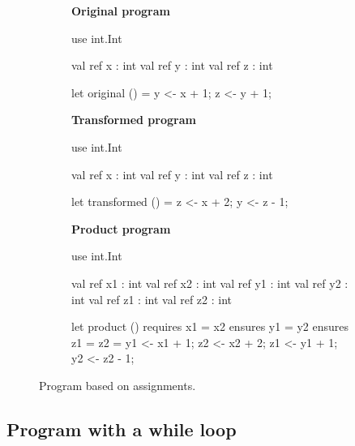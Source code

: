 \begin{figure}
  \centering
  \begin{subfigure}[b]{0.45\textwidth}
    \begin{minipage}[t]{\linewidth}
      \textbf{Original program}
      \begin{whylang}
        use int.Int
      
        val ref x : int
        val ref y : int
        val ref z : int
      
        let original ()
          =
          y <- x + 1; 
          z <- y + 1;
      \end{whylang}
    \end{minipage}
  \end{subfigure}
  \hfill
  \begin{subfigure}[b]{0.45\textwidth}
    \begin{minipage}[t]{\linewidth}
      \textbf{Transformed program}
      \begin{whylang}
        use int.Int
      
        val ref x : int
        val ref y : int
        val ref z : int
      
        let transformed ()
          =
          z <- x + 2; 
          y <- z - 1;
      \end{whylang}
    \end{minipage}
  \end{subfigure}
  \hfill
  \begin{subfigure}[b]{0.9\textwidth}
    \begin{minipage}[t]{\linewidth}
      \textbf{Product program}
      \begin{whylang}
        use int.Int
      
        val ref x1 : int
        val ref x2 : int
        val ref y1 : int
        val ref y2 : int
        val ref z1 : int
        val ref z2 : int
      
        let product ()
          requires { x1 = x2 }
          ensures { y1 = y2 }
          ensures { z1 = z2 }
          =
          y1 <- x1 + 1; 
          z2 <- x2 + 2;
          z1 <- y1 + 1;
          y2 <- z2 - 1;
      \end{whylang}
    \end{minipage}
  \end{subfigure}
  \caption{Program based on assignments.}
  \label{fig:pp_ex_assignments}
\end{figure}


\subsection{Program with a while loop}
\label{sub:results_while}




